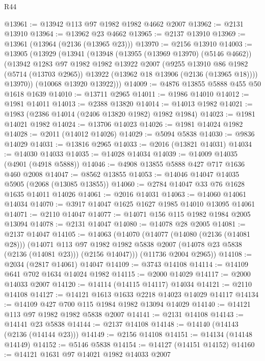 \begin{lexlean}{R44}
\begin{coremodule}
@13961 := @13942 @113 @97 @1982 @1982 @4662 @2007
@13962 := @2131 @13910
@13964 := @13962 @23 @4662
@13965 := @2137 @13910
@13969 := @13961 (@13964 (@2136 (@13965 @23)))
@13970 := @2156 @13910
@14003 := @13905
    (@13929
      (@13941
        (@13948
          (@13955 (@13969 @13970) (@5146 @4662))
          (@13942
            @1283
            @97
            @1982
            @1982
            @13922
            @2007
            (@9255
              @13910
              @86
              @1982
              (@5714 (@13703 @2965))
              @13922
              (@13962 @18 @13906 (@2136 (@13965 @18))))
            @13970))
        (@10068 @13920 @13922)))
@14009 := @4876 @13855 @5888 @455 @50 @1618 @1639
@14010 := @13711 @2965
@14011 := @1986 @14010
@14012 := @1981 @14011
@14013 := @2388 @13820
@14014 := @14013 @1982
@14021 := @1983 (@2386 @14014 (@2406 @13820 @1982) @1982 @1984)
@14023 := @1981 @14021 @1982
@14024 := @13706 @14023
@14026 := @1981 @14024 @1982
@14028 := @2011 (@14012 @14026)
@14029 := @5094 @5838
@14030 := @9836 @14029
@14031 := @13816 @2965
@14033 := @2016 (@13821 @14031)
@14034 := @14030 @14033
@14035 := @14028 @14034
@14039 := @14009 @14035 (@4901 (@4918 @5888))
@14046 := @4908 @13855 @5888 @427 @717 @1636 @460 @2008
@14047 := @8562 @13855
@14053 := @14046 @14047 @14035 @5905 (@2068 (@13085 @13855))
@14060 := @2784 @14047 @33 @76 @1628 @1635 @14011 @14026
@14061 := @2016 @14031
@14063 := @14060 @14061 @14034
@14070 := @3917 @14047 @1625 @1627 @1985 @14010 @13095 @14061
@14071 := @2110 @14047
@14077 := @14071 @156 @115 @1982 @1984 @2005 @13094
@14078 := @2131 @14047
@14080 := @14078 @28 @2005
@14081 := @2137 @14047
@14105 := @14063
    (@14070
      (@14077
        (@14080 (@2136 (@14081 @28)))
        (@14071
          @113
          @97
          @1982
          @1982
          @5838
          @2007
          (@14078 @23 @5838 (@2136 (@14081 @23)))
          (@2156 @14047)))
      (@11736 @2004 @2965))
@14108 := @2034 (@2817 @14061) @14047
@14109 := @3743 @14108
@14114 := @14109 @641 @702 @1634 @14024 @1982
@14115 := @2000 @14029
@14117 := @2000 @14033 @2007
@14120 := @14114 (@14115 @14117) @14034
@14121 := @2110 @14108
@14127 := @14121 @1613 @1633 @2218 @14023 @14029 @14117
@14134 := @14109 @427 @700 @115 @1984 @1982 @13094 @14029
@14140 := @14121 @113 @97 @1982 @1982 @5838 @2007
@14141 := @2131 @14108
@14143 := @14141 @23 @5838
@14144 := @2137 @14108
@14148 := @14140 (@14143 (@2136 (@14144 @23)))
@14149 := @2156 @14108
@14151 := @14134 (@14148 @14149)
@14152 := @5146 @5838
@14154 := @14127 (@14151 @14152)
@14160 := @14121 @1631 @97 @14021 @1982 @14033 @2007

\end{coremodule}
\end{lexlean}
